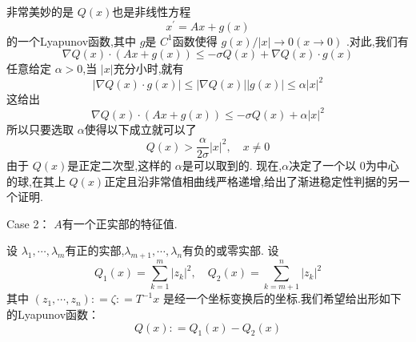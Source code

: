 \documentclass[lang=cn,12pt,color=green,fontset=none]{elegantbook}
\begin{document}
非常美妙的是 $ Q\left( x \right)  $也是非线性方程 $$
x^{\prime} =Ax+ g\left( x \right) 
$$的一个Lyapunov函数,其中 $ g $是 $ C^{1} $函数使得 $ g\left( x \right)/\left| x \right|\to 0 (x\to 0 )  $    .对此,我们有 $$
\nabla Q\left( x \right)\cdot \left( Ax+ g\left( x \right)  \right) \le  -\sigma Q\left( x \right)+  \nabla Q\left( x \right)\cdot g\left( x \right)     
$$任意给定 $ \alpha >0 $,当 $ \left| x \right|  $充分小时,就有  $$
\left| \nabla Q\left( x \right)\cdot g\left( x \right)   \right| \le  \left| \nabla Q\left( x \right)  \right|\left| g\left( x \right)  \right| \le  \alpha \left| x \right|^{2}    
$$ 这给出 $$
\nabla Q\left( x \right)\cdot \left( Ax+  g\left( x \right)  \right) \le  -\sigma Q\left( x \right)+ \alpha \left| x \right|^{2}    
$$所以只要选取 $ \alpha  $使得以下成立就可以了 $$
Q\left( x \right)> \frac{\alpha}{2\sigma }\left| x \right|^{2}  ,\quad  x \neq  0
$$ 由于 $ Q\left( x \right)  $是正定二次型,这样的 $ \alpha  $是可以取到的.  现在,$ \alpha  $决定了一个以 $ 0 $为中心的球,在其上 $ Q\left( x \right)  $正定且沿非常值相曲线严格递增,给出了渐进稳定性判据的另一个证明.   


\begin{large}
    \noindent Case 2： $ A $有一个正实部的特征值. 
\end{large}

设 $  \lambda _{1},\cdots , \lambda _{m} $有正的实部,$  \lambda _{m+ 1},\cdots , \lambda _{n} $有负的或零实部.  
设 $$
Q_1\left( x \right) =\sum _{k=1}^{m} \left| z_{k} \right|^{2},\quad Q_2\left( x \right)=\sum _{k=m+ 1}^{n}\left| z_{k} \right|^{2}   
$$其中 $ \left( z_1,\cdots ,z_{n} \right): =\zeta : = T^{-1} x  $ 是经一个坐标变换后的坐标.我们希望给出形如下的Lyapunov函数： $$
Q\left( x \right): = Q_1\left( x \right)-Q_2\left( x \right)   
$$
\end{document}
